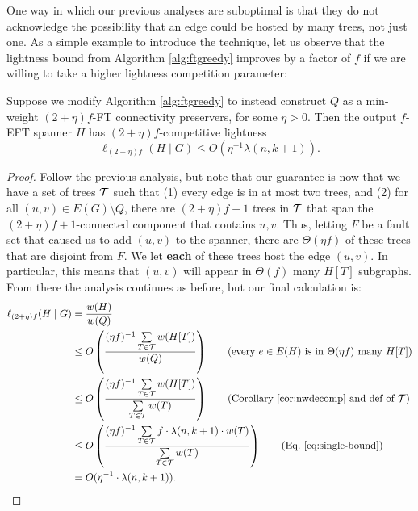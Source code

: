 One way in which our previous analyses are suboptimal is that they do not acknowledge the possibility that an edge could be hosted by many trees, not just one.
As a simple example to introduce the technique, let us observe that the lightness bound from Algorithm \ref{alg:ftgreedy} improves by a factor of $f$ if we are willing to take a higher lightness competition parameter:
\begin{theorem} \label{thm:high-parameter-lightness}
Suppose we modify Algorithm \ref{alg:ftgreedy} to instead construct $Q$ as a min-weight $(2+\eta)f$-FT connectivity preservers, for some $\eta >0$.
Then the output $f$-EFT spanner $H$ has $(2+\eta)f$-competitive lightness
$$ \ell_{(2+\eta)f}(H \mid G) \le O\left( \eta^{-1} \lambda(n, k+1)\right).$$
\end{theorem}
\begin{proof}
Follow the previous analysis, but note that our guarantee is now that we have a set of trees $\mathcal{T}$ such that (1) every edge is in at most two trees, and (2) for all $(u, v) \in E(G) \setminus Q$, there are $(2+\eta)f+1$ trees in $\mathcal{T}$ that span the $(2+\eta)f+1$-connected component that contains $u, v$.
Thus, letting $F$ be a fault set that caused us to add $(u, v)$ to the spanner, there are $\Theta(\eta f)$ of these trees that are disjoint from $F$.
We let \textbf{each} of these trees host the edge $(u, v)$.
In particular, this means that $(u, v)$ will appear in $\Theta(f)$ many $H[T]$ subgraphs.
From there the analysis continues as before, but our final calculation is:
\begin{align*}
\ell_{(2+\eta)f}(H \mid G) &= \frac{w(H)}{w(Q)}\\
&\leq O\left(\frac{(\eta f)^{-1} \sum \limits_{T \in \tee} w(H[T])}{w(Q)}\right) \tag{every $e \in E(H)$ is in $\Theta(\eta f)$ many $H[T]$} \\ 
&\leq O\left(\frac{(\eta f)^{-1} \sum \limits_{T \in \tee} w(H[T])}{\sum \limits_{T \in \tee} w(T)}\right) \tag{Corollary~\ref{cor:nwdecomp} and def of $\tee$}\\
&\le  O\left( \frac{(\eta f)^{-1} \sum \limits_{T \in \tee} f \cdot \lambda(n, k+1) \cdot w(T)}{\sum \limits_{T \in \tee} w(T)} \right) \tag{Eq.~\eqref{eq:single-bound}}\\
&= O(\eta^{-1} \cdot \lambda(n, k+1)). \tag*{\qedhere}
\end{align*}
\end{proof}

